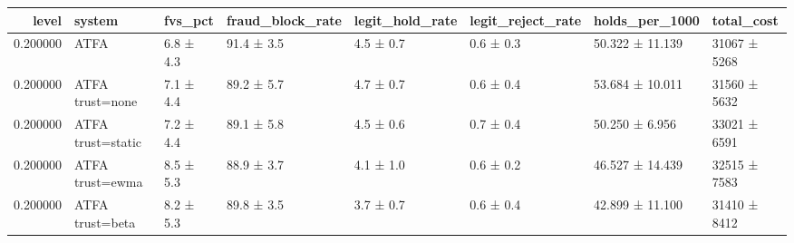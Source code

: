 \begin{tabular}{rlllllll}
\toprule
level & system & fvs\_pct & fraud\_block\_rate & legit\_hold\_rate & legit\_reject\_rate & holds\_per\_1000 & total\_cost \\
\midrule
0.200000 & ATFA & 6.8 ± 4.3 & 91.4 ± 3.5 & 4.5 ± 0.7 & 0.6 ± 0.3 & 50.322 ± 11.139 & 31067 ± 5268 \\
0.200000 & ATFA trust=none & 7.1 ± 4.4 & 89.2 ± 5.7 & 4.7 ± 0.7 & 0.6 ± 0.4 & 53.684 ± 10.011 & 31560 ± 5632 \\
0.200000 & ATFA trust=static & 7.2 ± 4.4 & 89.1 ± 5.8 & 4.5 ± 0.6 & 0.7 ± 0.4 & 50.250 ± 6.956 & 33021 ± 6591 \\
0.200000 & ATFA trust=ewma & 8.5 ± 5.3 & 88.9 ± 3.7 & 4.1 ± 1.0 & 0.6 ± 0.2 & 46.527 ± 14.439 & 32515 ± 7583 \\
0.200000 & ATFA trust=beta & 8.2 ± 5.3 & 89.8 ± 3.5 & 3.7 ± 0.7 & 0.6 ± 0.4 & 42.899 ± 11.100 & 31410 ± 8412 \\
\bottomrule
\end{tabular}
